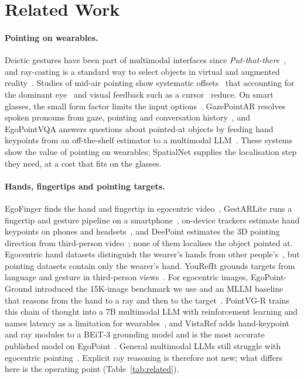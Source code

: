 \section{Related Work}\label{sec:related}

\paragraph{Pointing on wearables.} Deictic gestures have been part of multimodal interfaces since \emph{Put-that-there}~\cite{bolt1980put}, and ray-casting is a standard way to select objects in virtual and augmented reality~\cite{argelaguet2013survey}. Studies of mid-air pointing show systematic offsets~\cite{mayer2015modeling} that accounting for the dominant eye~\cite{plaumann2018towards} and visual feedback such as a cursor~\cite{mayer2018effect} reduce. On smart glasses, the small form factor limits the input options~\cite{lee2018interaction}. GazePointAR resolves spoken pronouns from gaze, pointing and conversation history~\cite{lee2024gazepointar}, and EgoPointVQA answers questions about pointed-at objects by feeding hand keypoints from an off-the-shelf estimator to a multimodal LLM~\cite{choi2026hint}. These systems show the value of pointing on wearables; SpatialNet supplies the localisation step they need, at a cost that fits on the glasses.

\paragraph{Hands, fingertips and pointing targets.} EgoFinger finds the hand and fingertip in egocentric video~\cite{huang2016pointing}, GestARLite runs a fingertip and gesture pipeline on a smartphone~\cite{jain2019gestarlite}, on-device trackers estimate hand keypoints on phones and headsets~\cite{zhang2020mediapipe,han2020megatrack}, and DeePoint estimates the 3D pointing direction from third-person video~\cite{nakamura2023deepoint}; none of them localises the object pointed at. Egocentric hand datasets distinguish the wearer's hands from other people's~\cite{bambach2015lending,shan2020understanding}, but pointing datasets contain only the wearer's hand. YouRefIt grounds targets from language and gesture in third-person views~\cite{chen2021yourefit}. For egocentric images, EgoPoint-Ground introduced the 15K-image benchmark we use and an MLLM baseline that reasons from the hand to a ray and then to the target~\cite{egopoint}. PointVG-R trains this chain of thought into a 7B multimodal LLM with reinforcement learning and names latency as a limitation for wearables~\cite{li2026pointvgr}, and VistaRef adds hand-keypoint and ray modules to a BEiT-3 grounding model and is the most accurate published model on EgoPoint~\cite{li2026vistaref}. General multimodal LLMs still struggle with egocentric pointing~\cite{li2026egopointbench}. Explicit ray reasoning is therefore not new; what differs here is the operating point (Table~\ref{tab:related}).

